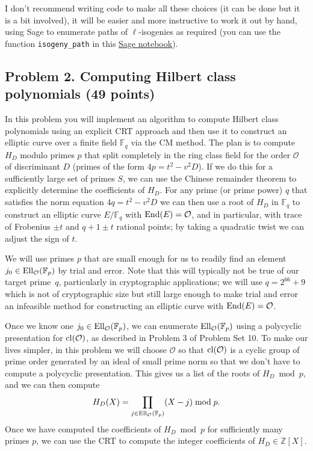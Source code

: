 \documentclass[11pt]{article}
\newcommand{\Fp}{\mathbb{F}_p}
\newcommand{\Fq}{\mathbb{F}_q}
\newcommand{\Z}{\mathbb{Z}}
\newcommand{\End}{{\rm End}}
\renewcommand{\O}{\mathcal{O}}
\newcommand{\EllO}{{\rm Ell}_\O}
\newcommand{\cl}{{\rm cl}}
\begin{document}
I don't recommend writing code to make all these choices (it can be done but it is a bit involved), it will be easier and more instructive to work it out by hand, using Sage to enumerate paths of $\ell$-isogenies as required (you can use the function \texttt{isogeny\_path} in this \href{https://cocalc.com/share/public_paths/e2a45f293be2d00354622ee999c2dc3801c0caba}{Sage notebook}).


\subsection*{Problem 2. Computing Hilbert class polynomials (49 points)}
In this problem you will implement an algorithm to compute Hilbert class polynomials using an explicit CRT approach and then use it to construct an elliptic curve over a finite field $\Fq$ via the CM method.
The plan is to compute $H_D$ modulo primes $p$ that split completely in the ring class field for the order $\O$ of discriminant $D$ (primes of the form $4p=t^2-v^2D$).
If we do this for a sufficiently large set of primes $S$, we can use the Chinese remainder theorem to explicitly determine the coefficients of $H_D$.  For any prime (or prime power) $q$ that satisfies the norm equation $4q=t^2-v^2D$ we can then use a root of $H_D$ in $\Fq$ to construct an elliptic curve $E/\Fq$ with $\End(E)=\O$, and in particular, with trace of Frobenius $\pm t$ and $q+1\pm t$ rational points; by taking a quadratic twist we can adjust the sign of $t$.

We will use primes $p$ that are small enough for us to readily find an element $j_0\in\EllO(\Fp)$ by trial and error.  Note that this will typically not be true of our target prime~$q$, particularly in cryptographic applications; we will use $q=2^{66}+9$ which is not of cryptographic size but still large enough to make trial and error an infeasible method for constructing an elliptic curve with $\End(E)=\O$.

Once we know one $j_0\in \EllO(\Fp)$, we can enumerate $\EllO(\Fp)$ using a polycyclic presentation for $\cl(\O)$, as described in Problem 3 of Problem Set 10.
To make our lives simpler, in this problem we will choose $\O$ so that $\cl(\O)$ is a cyclic group of prime order generated by an ideal of small prime norm so that we don't have to compute a polycyclic presentation.
This gives us a list of the roots of $H_D\bmod p$, and we can then compute
\begin{equation}\label{prod}
H_D(X)=\prod_{j\in\EllO(\Fp)}(X-j) \bmod p.
\end{equation}
Once we have computed the coefficients of $H_D\bmod p$ for sufficiently many primes $p$, we can use the CRT to compute the integer coefficients of $H_D\in \Z[X]$.
\end{document}
